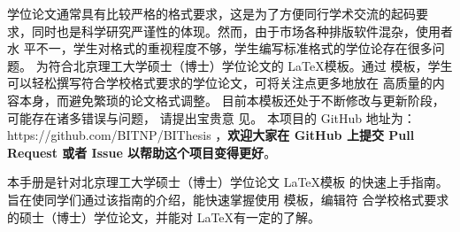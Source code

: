 \begin{conclusion}


学位论文通常具有比较严格的格式要求，这是为了方便同行学术交流的起码要
求，同时也是科学研究严谨性的体现。然而，由于市场各种排版软件混杂，使用者水
平不一，学生对格式的重视程度不够，学生编写标准格式的学位论存在很多问题。
\BIThesis 为符合北京理工大学硕士（博士）学位论文的 \LaTeX 模板。通过 \BIThesis 模板，学生可以轻松撰写符合学校格式要求的学位论文，可将关注点更多地放在
高质量的内容本身，而避免繁琐的论文格式调整。
目前本模板还处于不断修改与更新阶段，
可能存在诸多错误与问题，
请提出宝贵意
见。
本项目的 GitHub 地址为：
https://github.com/BITNP/BIThesis ，\textbf{欢迎大家在 GitHub 上提交
Pull Request 或者 Issue 以帮助这个项目变得更好}。

本手册是针对北京理工大学硕士（博士）学位论文 \LaTeX 模板 \BIThesis 的快速上手指南。
旨在使同学们通过该指南的介绍，能快速掌握使用 \BIThesis 模板，编辑符
合学校格式要求的硕士（博士）学位论文，并能对 \LaTeX 有一定的了解。
  
\end{conclusion}
